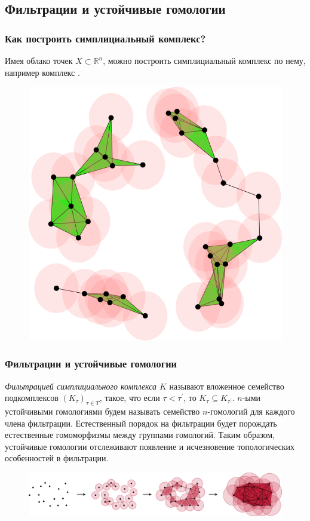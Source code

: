 \documentclass{beamer}
\begin{document}
		\subsection{Фильтрации и устойчивые гомологии}
		\begin{frame}
			\frametitle{Как построить симплициальный комплекс?}
			
			Имея облако точек $X \subset \mathbb{R}^n$, можно построить симплициальный комплекс по нему, например комплекс .
			\begin{figure}
				\centering
				\includegraphics[scale=0.3]{vr.png}
			\end{figure}
		\end{frame}
		\begin{frame}
			\frametitle{Фильтрации и устойчивые гомологии}
			{\it Фильтрацией симплициального комплекса $K$} называют вложенное семейство подкомплексов $ (K_\tau)_{\tau \in T} $, такое, что если $ \tau < \tau^{'} $, то $ K_\tau \subseteq K_{\tau^{'}} $.
			$n$-ыми устойчивыми гомологиями будем называть семейство $n$-гомологий для каждого члена фильтрации. Естественный порядок на фильтрации будет порождать естественные гомоморфизмы между группами гомологий. Таким образом, устойчивые гомологии отслеживают появление и исчезновение топологических особенностей в фильтрации.
			\begin{figure}
				\centering
				\includegraphics[width=\linewidth]{filtration.png}
		\end{figure}
		\end{frame}
\end{document}
